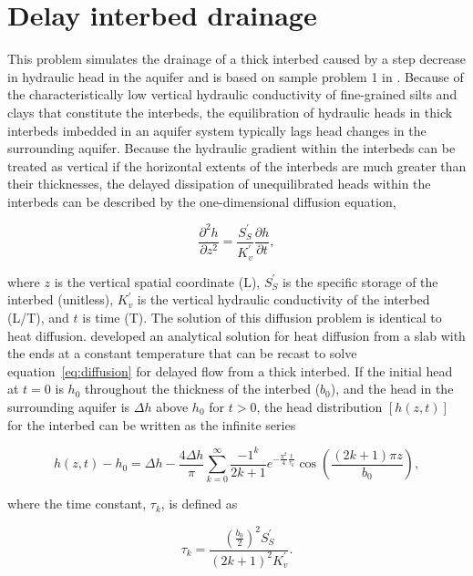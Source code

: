 \section{Delay interbed drainage}
This problem simulates the drainage of a thick interbed caused by a step decrease in hydraulic head in the aquifer and is based on sample problem 1 in \cite{hoffmann2003modflow}. Because of the characteristically low vertical hydraulic conductivity of fine-grained silts and clays that constitute the interbeds, the equilibration of hydraulic heads in thick interbeds imbedded in an aquifer system typically lags head changes in the surrounding aquifer. Because the hydraulic gradient within the interbeds can be treated as vertical if the horizontal extents of the interbeds are much greater than their thicknesses, the delayed dissipation of unequilibrated heads within the interbeds can be described by the one-dimensional diffusion equation,

\begin{equation}
	\frac{\partial ^2 h}{\partial z^2} = \frac{S^{\prime}_{S}}{K^{\prime}_{v}} \frac{\partial h}{\partial t},
	\label{eq:diffusion}
\end{equation}

\noindent where $z$ is the vertical spatial coordinate (L), $S^{\prime}_{S}$ is the specific storage of the interbed (unitless), $K^{\prime}_{v}$ is the vertical hydraulic conductivity of the interbed (L/T), and $t$ is time (T). The solution of this diffusion problem is identical to heat diffusion. \cite{carslaw1959conduction} developed an analytical solution for heat diffusion from a slab with the ends at a constant temperature that can be recast to solve equation~\ref{eq:diffusion} for delayed flow from a thick interbed. If the initial head at $t = 0$ is $h_0$ throughout the thickness of the interbed ($b_0$), and the head in the surrounding aquifer is $\Delta h$ above $h_0$ for $t > 0$, the head distribution $[h(z, t)]$ for the interbed can be written as the infinite series

\begin{equation}
	h(z, t) - h_0 = \Delta h - \frac{4 \Delta h}{\pi} \sum^{\infty}_{k = 0} \frac{-1^k}{2k + 1} e^{-\frac{\pi^2}{4} \frac{t}{\tau_k}} \cos \left( \frac{(2k + 1) \pi z}{b_0} \right),
	\label{eq:headdist}
\end{equation}

\noindent where the time constant, $\tau_k$, is defined as 

\begin{equation}
	\tau_k = \frac{ \left( \frac{b_0}{2} \right)^2 S^{\prime}_{S} }{\left( 2k + 1 \right)^2 K^{\prime}_{v}}.
	\label{eq:tauk}
\end{equation}

